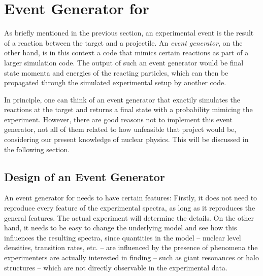 

\section{Event Generator for \rtb{}}
As briefly mentioned in the previous section, an experimental event is the result of a reaction between the target and a projectile.
An \emph{event generator}, on the other hand, is in this context a code that mimics certain reactions as part of a larger simulation code. The output of such an event generator would be final state momenta and energies of the reacting particles, which can then be propagated through the simulated experimental setup by another code. %

In principle, one can think of an event generator that exactily simulates the reactions at the target and returns a final state with a probability mimicing the experiment. However, there are good reasons not to implement this event generator, not all of them related to how unfeasible that project would be, considering our present knowledge of nuclear physics. This will be discussed in the following section.


\subsection{Design of an Event Generator}
An event generator for \rtb{} needs to have certain features:
Firstly, it does not need to reproduce every feature of the experimental spectra, as long as it reproduces the general features. The actual experiment will determine the details.
On the other hand, it needs to be easy to change the underlying model and see how this influences the resulting spectra, since quantities in the model -- nuclear level densities, transition rates, etc. -- are influenced by the presence of phenomena the experimenters are actually interested in finding -- such as giant resonances or halo structures -- which are not directly observable in the experimental data.
 
